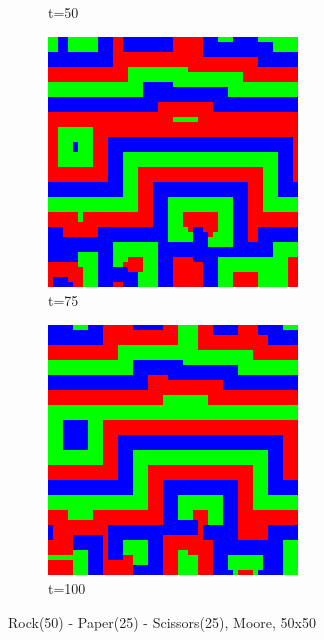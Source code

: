 \documentclass[a4paper, 11pt]{article}
\begin{document}
\begin{landscape}
\begin{figure}[H]
\begin{subfigure}{.20\textwidth}
  \caption{t=50}
\end{subfigure}%
\begin{subfigure}{.20\textwidth}
  \centering
  \includegraphics[width=0.95\linewidth]{ROCK_PAPER_SCISSORS_MOORE_50x50_HighRockPop50_t75}
  \caption{t=75}
\end{subfigure}%
\begin{subfigure}{.20\textwidth}
  \centering
  \includegraphics[width=0.95\linewidth]{ROCK_PAPER_SCISSORS_MOORE_50x50_HighRockPop50_t100}
  \caption{t=100}
\end{subfigure}
\caption{Rock(50) - Paper(25) - Scissors(25), Moore, 50x50}
\end{figure}



\end{landscape}
\end{document}

